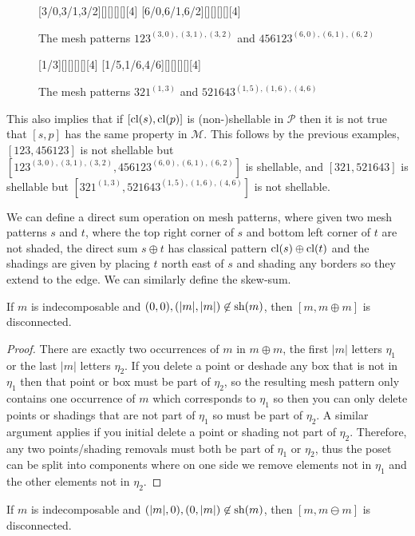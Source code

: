 \documentclass[11pt,a4paper,oneside]{article}
\begin{document}
\begin{figure}[h]\centering
{}[3/0,3/1,3/2][][][][][4]
[6/0,6/1,6/2][][][][][4]
\caption{The mesh patterns $123^{(3,0),(3,1),(3,2)}$ and $456123^{(6,0),(6,1),(6,2)}$}\label{fig:123}
\end{figure}
\begin{figure}[h]\centering
{}[1/3][][][][][4]
[1/5,1/6,4/6][][][][][4]
\caption{The mesh patterns $321^{(1, 3)}$ and $521643^{(1, 5), (1, 6), (4, 6)}$}\label{fig:321}
\end{figure}

This also implies that if $[\operatorname{\textrm{cl}}(s),\operatorname{\textrm{cl}}(p)]$ is (non-)shellable in $\mathcal{P}$
then it is not true that $[s,p]$ has the same property in $\mathcal{M}$. This
follows by the previous examples, $[123,456123]$ is not shellable but
$[123^{(3,0),(3,1),(3,2)},456123^{(6,0),(6,1),(6,2)}]$ is shellable, and
$[321,521643]$ is shellable but $[321^{(1, 3)},521643^{(1, 5), (1, 6), (4, 6)}]$
is not shellable.

We can define a direct sum operation on mesh patterns, where given two mesh
patterns $s$ and $t$, where the top right corner of $s$ and bottom left corner
of $t$ are not shaded, the direct sum $s\oplus t$ has classical pattern
$\operatorname{\textrm{cl}}(s)\oplus\operatorname{\textrm{cl}}(t)$ and the shadings are given by placing $t$ north east of $s$
and shading any borders so they extend to the edge. We can similarly define the
skew-sum.

\begin{lem}
If $m$ is indecomposable and $(0,0),(|m|,|m|)\not\in\operatorname{\textrm{sh}}(m)$, then
$[m,m\oplus m]$ is disconnected.
\begin{proof}
There are exactly two occurrences of $m$ in $m\oplus m$, the first $|m|$ letters
$\eta_1$ or the last $|m|$ letters $\eta_2$. If you delete a point or deshade
any box that is not in $\eta_1$ then that point or box must be part of $\eta_2$,
so the resulting mesh pattern only contains one occurrence of $m$ which
corresponds to $\eta_1$ so then you can only delete points or shadings that are
not part of $\eta_1$ so must be part of $\eta_2$. A similar argument applies if
you initial delete a point or shading not part of $\eta_2$. Therefore, any two
points/shading removals must both be part of $\eta_1$ or $\eta_2$, thus the
poset can be split into components where on one side we remove elements not in
$\eta_1$ and the other elements not in $\eta_2$.
\end{proof}
\end{lem}
\begin{cor}
If $m$ is indecomposable and $(|m|,0),(0,|m|)\not\in\operatorname{\textrm{sh}}(m)$, then
$[m,m\ominus m]$ is disconnected.
\end{cor}
\end{document}
